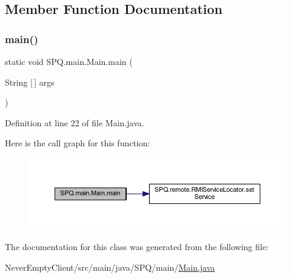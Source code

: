 \subsection{Member Function Documentation}
\mbox{\label{class_s_p_q_1_1main_1_1_main_ac7d2350f6924287c711b7e2bf1c430fa}} 
\subsubsection{\texorpdfstring{main()}{main()}}
{\footnotesize\ttfamily static void S\+P\+Q.\+main.\+Main.\+main (\begin{DoxyParamCaption}\item[{String \mbox{[}$\,$\mbox{]}}]{args }\end{DoxyParamCaption})\hspace{0.3cm}{\ttfamily [static]}}



Definition at line 22 of file Main.\+java.

Here is the call graph for this function\+:
\nopagebreak
\begin{figure}[H]
\begin{center}
\leavevmode
\includegraphics[width=350pt]{class_s_p_q_1_1main_1_1_main_ac7d2350f6924287c711b7e2bf1c430fa_cgraph}
\end{center}
\end{figure}


The documentation for this class was generated from the following file\+:\begin{DoxyCompactItemize}
\item 
Never\+Empty\+Client/src/main/java/\+S\+P\+Q/main/\mbox{\hyperlink{_main_8java}{Main.\+java}}\end{DoxyCompactItemize}
